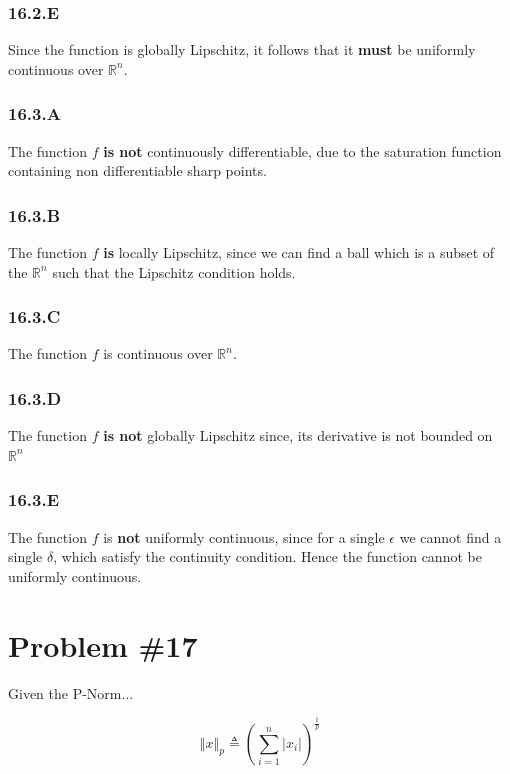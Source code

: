 \documentclass[12px]{article}
\newcommand{\R}{\mathbb{R}}
\begin{document}
\subsubsection*{16.2.E}
Since the function is globally Lipschitz, it follows that it \textbf{must} be uniformly continuous over $\R^n$.


\subsubsection*{16.3.A}

The function $f$ \textbf{is not} continuously differentiable, due to the saturation function containing non differentiable sharp points.

\subsubsection*{16.3.B}

The function $f$ \textbf{is} locally Lipschitz, since we can find a ball which is a subset of the $\R^n$ such that the Lipschitz condition holds.
\subsubsection*{16.3.C}

The function $f$ is continuous over $\R^n$.
\subsubsection*{16.3.D}

The function $f$ \textbf{is not} globally Lipschitz since, its derivative is not bounded on $\R^n$
\subsubsection*{16.3.E}

The function $f$ is \textbf{not} uniformly continuous, since for a single $\epsilon$ we cannot find a single $\delta$, which satisfy the continuity condition. Hence the function cannot be uniformly continuous.






\section{Problem \#17}

Given the P-Norm...

$$
\left\Vert x\right\Vert_{p} \triangleq \left( \sum_{i = 1}^{n} |x_{i}| \right)^{\frac{1}{p}}
$$
\end{document}

